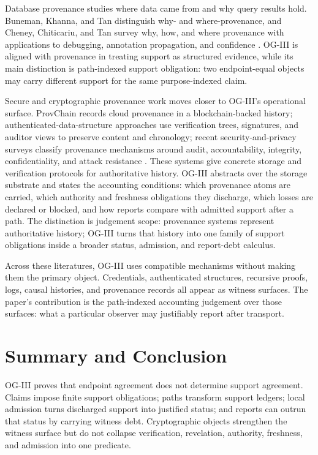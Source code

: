 \documentclass[11pt,twoside]{article}
\theoremstyle{definition}
\begin{document}
Database provenance studies where data came from and why query results hold.
Buneman, Khanna, and Tan distinguish why- and where-provenance, and Cheney,
Chiticariu, and Tan survey why, how, and where provenance with applications to
debugging, annotation propagation, and confidence
\cite{buneman_why_where_2001,cheney_provenance_databases_2009}. OG-III is
aligned with provenance in treating support as structured evidence, while its
main distinction is path-indexed support obligation: two endpoint-equal objects
may carry different support for the same purpose-indexed claim.

Secure and cryptographic provenance work moves closer to OG-III's operational
surface. ProvChain records cloud provenance in a blockchain-backed history;
authenticated-data-structure approaches use verification trees, signatures, and
auditor views to preserve content and chronology; recent security-and-privacy
surveys classify provenance mechanisms around audit, accountability, integrity,
confidentiality, and attack resistance
\cite{liang_provchain_2017,jamil_secure_provenance_2018,pan_data_provenance_security_2023}.
These systems give concrete storage and verification protocols for authoritative
history. OG-III abstracts over the storage substrate and states the accounting
conditions: which provenance atoms are carried, which authority and freshness
obligations they discharge, which losses are declared or blocked, and how
reports compare with admitted support after a path. The distinction is
judgement scope: provenance systems represent authoritative history; OG-III
turns that history into one family of support obligations inside a broader
status, admission, and report-debt calculus.

Across these literatures, OG-III uses compatible mechanisms without making them
the primary object. Credentials, authenticated structures, recursive proofs,
logs, causal histories, and provenance records all appear as witness surfaces.
The paper's contribution is the path-indexed accounting judgement over those
surfaces: what a particular observer may justifiably report after transport.

\section{Summary and Conclusion}
\label{sec:conclusion}
\label{sec:ogiv}

OG-III proves that endpoint agreement does not determine support agreement.
Claims impose finite support obligations; paths transform support ledgers;
local admission turns discharged support into justified status; and reports can
outrun that status by carrying witness debt. Cryptographic objects strengthen
the witness surface but do not collapse verification, revelation, authority,
freshness, and admission into one predicate.
\end{document}
